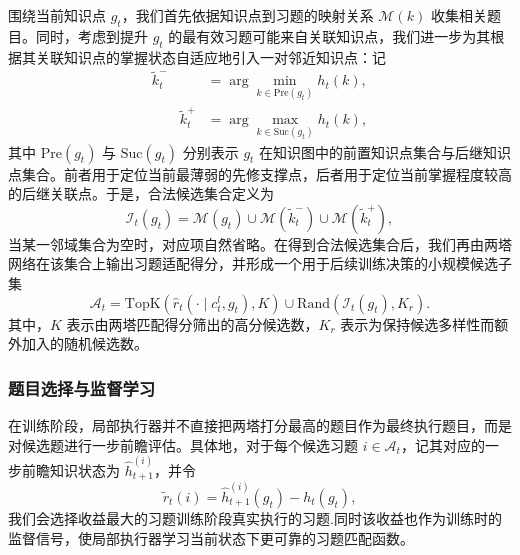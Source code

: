 \documentclass[11pt,a4paper]{article}
\begin{document}
围绕当前知识点 $g_t$，我们首先依据知识点到习题的映射关系 $\mathcal{M}(k)$ 收集相关题目。同时，考虑到提升 $g_t$ 的最有效习题可能来自关联知识点，我们进一步为其根据其关联知识点的掌握状态自适应地引入一对邻近知识点：记
\begin{equation}
\begin{aligned}
\tilde{k}_t^{-}
&=
\arg\min_{k\in \mathrm{Pre}(g_t)} h_t(k),\\\qquad
\tilde{k}_t^{+}
&=
\arg\max_{k\in \mathrm{Suc}(g_t)} h_t(k),  
\end{aligned}
\end{equation}
其中 $\mathrm{Pre}(g_t)$ 与 $\mathrm{Suc}(g_t)$ 分别表示 $g_t$ 在知识图中的前置知识点集合与后继知识点集合。前者用于定位当前最薄弱的先修支撑点，后者用于定位当前掌握程度较高的后继关联点。于是，合法候选集合定义为
\begin{equation}
\mathcal{I}_t(g_t)
=
\mathcal{M}(g_t)\cup
\mathcal{M}(\tilde{k}_t^{-})\cup
\mathcal{M}(\tilde{k}_t^{+})
,
\end{equation}
当某一邻域集合为空时，对应项自然省略。在得到合法候选集合后，我们再由两塔网络在该集合上输出习题适配得分，并形成一个用于后续训练决策的小规模候选子集
\begin{equation}
\mathcal{A}_t
=
\mathrm{TopK}\!\left(\hat{r}_{t}(\cdot\mid c_t^l,g_t),K\right)
\cup
\mathrm{Rand}\!\left(\mathcal{I}_t(g_t),K_r\right).
\end{equation}
其中，$K$ 表示由两塔匹配得分筛出的高分候选数，$K_r$ 表示为保持候选多样性而额外加入的随机候选数。

\subsubsection{题目选择与监督学习}

在训练阶段，局部执行器并不直接把两塔打分最高的题目作为最终执行题目，而是对候选题进行一步前瞻评估。具体地，对于每个候选习题 $i\in\mathcal{A}_t$，记其对应的一步前瞻知识状态为 $\hat{h}_{t+1}^{(i)}$，并令
\begin{equation}
\tilde{r}_t(i)=
\hat{h}_{t+1}^{(i)}(g_t)-h_t(g_t),
\end{equation}
我们会选择收益最大的习题训练阶段真实执行的习题.同时该收益也作为训练时的监督信号，使局部执行器学习当前状态下更可靠的习题匹配函数。
\end{document}
